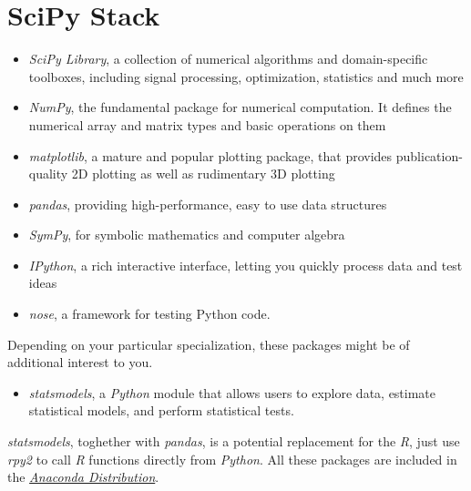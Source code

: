 \section{SciPy Stack}
\begin{itemize}

\item \textit{SciPy Library}, a collection of numerical algorithms and domain-specific toolboxes, including signal processing, optimization, statistics and much more
\item \textit{NumPy}, the fundamental package for numerical computation. It defines the numerical array and matrix types and basic operations on them
\item \textit{matplotlib}, a mature and popular plotting package, that provides publication-quality 2D plotting as well as rudimentary 3D plotting
\item \textit{pandas}, providing high-performance, easy to use data structures
\item \textit{SymPy}, for symbolic mathematics and computer algebra
\item \textit{IPython}, a rich interactive interface, letting you quickly process data and test ideas
\item \textit{nose}, a framework for testing Python code.
\end{itemize}

Depending on your particular specialization, these packages might be of additional interest to you.

\begin{itemize}
\item \textit{statsmodels}, a \textit{Python} module that allows users to explore data, estimate statistical models, and perform statistical tests. 
\end{itemize}

\textit{statsmodels}, toghether with \textit{pandas}, is a potential replacement for the \textit{R}, just use \textit{rpy2} to call \textit{R} functions directly from \textit{Python}. All these packages are included in the \href{https://www.continuum.io/why-anaconda}{\textit{Anaconda Distribution}}.
